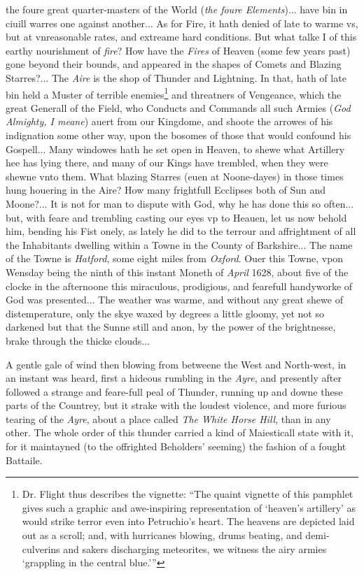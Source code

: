\documentclass[a4paper, 12pt, oneside, polutonikogreek, english]{article}
\begin{document}
the foure great quarter-masters of the World (\emph{the foure Elements})... have bin in ciuill warres one against another... As for Fire, it hath denied of late to warme vs, but at vnreasonable rates, and extreame hard conditions. But what talke I of this earthy nourishment of \emph{fire}? How have the \emph{Fires} of Heaven (some few years past) gone beyond their bounds, and appeared in the shapes of Comets and Blazing Starres?... The \emph{Aire} is the shop of Thunder and Lightning. In that, hath of late bin held a Muster of terrible enemies\footnote{Dr. Flight thus describes the vignette: ``The quaint vignette of this pamphlet gives such a graphic and awe-inspiring representation of `heaven's artillery' as would strike terror even into Petruchio's heart. The heavens are depicted laid out as a scroll; and, with hurricanes blowing, drums beating, and demi-culverins and sakers discharging meteorites, we witness the airy armies `grappling in the central blue.'''} and threatners of Vengeance, which the great Generall of the Field, who Conducts and Commands all such Armies (\emph{God Almighty, I meane}) auert from our Kingdome, and shoote the arrowes of his indignation some other way, upon the bosomes of those that would confound his Gospell... Many windowes hath he set open in Heaven, to shewe what Artillery hee has lying there, and many of our Kings have trembled, when they were shewne vnto them. What blazing Starres (euen at Noone-dayes) in those times hung houering in the Aire? How many frightfull Ecclipses both of Sun and Moone?... It is not for man to dispute with God, why he has done this so often... but, with feare and trembling casting our eyes vp to Heauen, let us now behold him, bending his Fist onely, as lately he did to the terrour and affrightment of all the Inhabitants dwelling within a Towne in the County of Barkshire... The name of the Towne is \emph{Hatford}, some eight miles from \emph{Oxford}. Ouer this Towne, vpon Wensday being the ninth of this instant Moneth of \emph{April} 1628, about five of the clocke in the afternoone this miraculous, prodigious, and fearefull handyworke of God was presented... The weather was warme, and without any great shewe of distemperature, only the skye waxed by degrees a little gloomy, yet not so darkened but that the Sunne still and anon, by the power of the brightnesse, brake through the thicke clouds...

A gentle gale of wind then blowing from betweene the West and North-west, in an instant was heard, first a hideous rumbling in the \emph{Ayre}, and presently after followed a strange and feare-full peal of Thunder, running up and downe these parts of the Countrey, but it strake with the loudest violence, and more furious tearing of the \emph{Ayre}, about a place called \emph{The White Horse Hill}, than in any other. The whole order of this thunder carried a kind of Maiesticall state with it, for it maintayned (to the offrighted Beholders' seeming) the fashion of a fought Battaile.
\end{document}
